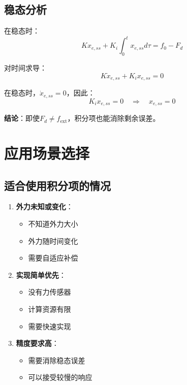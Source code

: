 \documentclass[12pt,a4paper]{article}
\begin{document}
\subsection{稳态分析}

在稳态时：
\begin{equation}
K x_{e,ss} + K_i \int_0^t x_{e,ss} d\tau = f_0 - F_d
\end{equation}

对时间求导：
\begin{equation}
K \dot{x}_{e,ss} + K_i x_{e,ss} = 0
\end{equation}

在稳态时，$\dot{x}_{e,ss} = 0$，因此：
\begin{equation}
K_i x_{e,ss} = 0 \quad \Rightarrow \quad x_{e,ss} = 0
\end{equation}

\textbf{结论}：即使$F_d \neq f_{\text{ext}}$，积分项也能消除剩余误差。

\section{应用场景选择}

\subsection{适合使用积分项的情况}

\begin{enumerate}
\item \textbf{外力未知或变化}：
\begin{itemize}
\item 不知道外力大小
\item 外力随时间变化
\item 需要自适应补偿
\end{itemize}

\item \textbf{实现简单优先}：
\begin{itemize}
\item 没有力传感器
\item 计算资源有限
\item 需要快速实现
\end{itemize}

\item \textbf{精度要求高}：
\begin{itemize}
\item 需要消除稳态误差
\item 可以接受较慢的响应
\end{itemize}
\end{enumerate}
\end{document}
